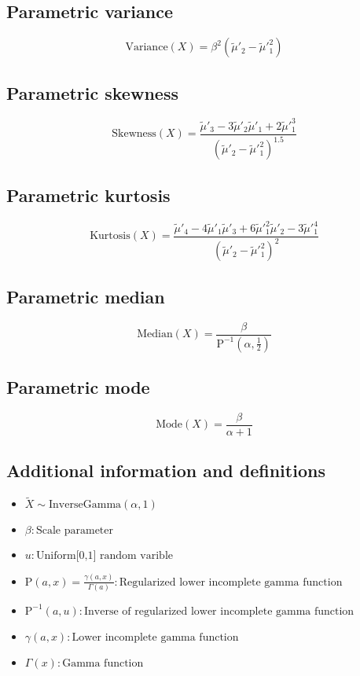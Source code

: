 \documentclass{article}
\begin{document}
\subsection{Parametric variance}
\begin{equation*} \mathrm{Variance}(X)=\beta^{2}(\tilde{\mu}'_{2}-\tilde{\mu}'^{2}_{1}) \end{equation*}
\subsection{Parametric skewness}
\begin{equation*} \mathrm{Skewness}(X)=\frac{\tilde{\mu}'_{3}-3\tilde{\mu}'_{2}\tilde{\mu}'_{1}+2\tilde{\mu}'^{3}_{1}}{(\tilde{\mu}'_{2}-\tilde{\mu}'^{2}_{1})^{1.5}} \end{equation*}
\subsection{Parametric kurtosis}
\begin{equation*} \mathrm{Kurtosis}(X)=\frac{\tilde{\mu}'_{4}-4\tilde{\mu}'_{1}\tilde{\mu}'_{3}+6\tilde{\mu}'^{2}_{1}\tilde{\mu}'_{2}-3\tilde{\mu}'^{4}_{1}}{(\tilde{\mu}'_{2}-\tilde{\mu}'^{2}_{1})^{2}} \end{equation*}
\subsection{Parametric median}
\begin{equation*} \mathrm{Median}(X)=\frac{\beta}{\text{P}^{-1}\left(\alpha,\frac{1}{2}\right)} \end{equation*}
\subsection{Parametric mode}
\begin{equation*} \mathrm{Mode}(X)=\frac{\beta}{\alpha+1} \end{equation*}
\subsection{Additional information and definitions}
\begin{itemize}
    \item $ \tilde{X}\sim\mathrm{InverseGamma}\left(\alpha,1\right) $
    \item $ \beta:\text{Scale parameter} $
    \item $ u:\text{Uniform[0,1] random varible} $
    \item $ \text{P}\left(a,x\right)=\frac{\gamma(a,x)}{\Gamma(a)}:\text{Regularized lower incomplete gamma function} $
    \item $ \text{P}^{-1}\left(a,u\right):\text{Inverse of regularized lower incomplete gamma function} $
    \item $ \gamma\left(a,x\right):\text{Lower incomplete gamma function} $
    \item $ \Gamma\left(x\right):\text{Gamma function} $
\end{itemize}
\end{document}
